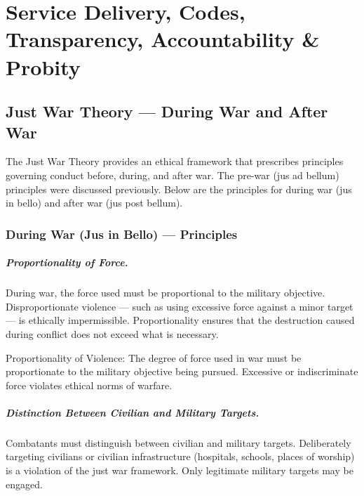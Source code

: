 \chapter{Service Delivery, Codes, Transparency, Accountability \& Probity}
\label{ch:service-delivery-codes-transparency-probity}

\section{Just War Theory --- During War and After War}
The Just War Theory provides an ethical framework that prescribes principles governing conduct before, during, and after war. The pre-war (jus ad bellum) principles were discussed previously. Below are the principles for during war (jus in bello) and after war (jus post bellum).

\subsection{During War (Jus in Bello) --- Principles}

\paragraph{Proportionality of Force.} During war, the force used must be proportional to the military objective. Disproportionate violence --- such as using excessive force against a minor target --- is ethically impermissible. Proportionality ensures that the destruction caused during conflict does not exceed what is necessary.

\begin{KeyConcept}
Proportionality of Violence: The degree of force used in war must be proportionate to the military objective being pursued. Excessive or indiscriminate force violates ethical norms of warfare.
\end{KeyConcept}

\paragraph{Distinction Between Civilian and Military Targets.} Combatants must distinguish between civilian and military targets. Deliberately targeting civilians or civilian infrastructure (hospitals, schools, places of worship) is a violation of the just war framework. Only legitimate military targets may be engaged.

